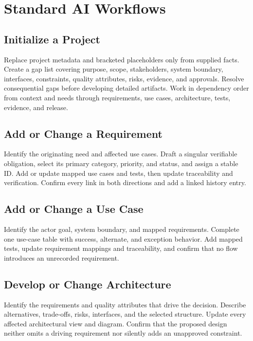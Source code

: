\section{Standard AI Workflows}
\label{Section:AIArchitectureWorkflow}

\subsection{Initialize a Project}
Replace project metadata and bracketed placeholders only from supplied facts.
Create a gap list covering purpose, scope, stakeholders, system boundary,
interfaces, constraints, quality attributes, risks, evidence, and approvals.
Resolve consequential gaps before developing detailed artifacts. Work in
dependency order from context and needs through requirements, use cases,
architecture, tests, evidence, and release.

\subsection{Add or Change a Requirement}
Identify the originating need and affected use cases. Draft a singular
verifiable obligation, select its primary category, priority, and status, and
assign a stable ID. Add or update mapped use cases and tests, then update
traceability and verification. Confirm every link in both directions and add a
linked history entry.

\subsection{Add or Change a Use Case}
Identify the actor goal, system boundary, and mapped requirements. Complete one
use-case table with success, alternate, and exception behavior. Add mapped
tests, update requirement mappings and traceability, and confirm that no flow
introduces an unrecorded requirement.

\subsection{Develop or Change Architecture}
Identify the requirements and quality attributes that drive the decision.
Describe alternatives, trade-offs, risks, interfaces, and the selected
structure. Update every affected architectural view and diagram. Confirm that
the proposed design neither omits a driving requirement nor silently adds an
unapproved constraint.

